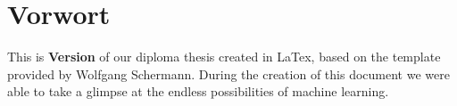 \chapter{Vorwort}

%
%
%

This is \textbf{Version \htldiplDate} of our diploma thesis created in LaTex, based on the template provided by Wolfgang Schermann.
During the creation of this document we were able to take a glimpse at the endless possibilities of machine learning.



